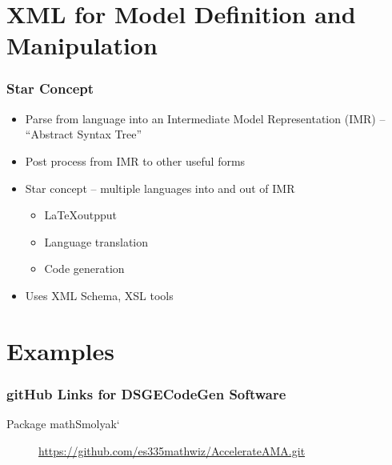 \documentclass[tikz]{beamer}
\begin{document}
\section{XML for  Model Definition and Manipulation}

\begin{frame}
  \frametitle{Star Concept}
  \begin{itemize}
 \item Parse from language into an Intermediate Model Representation (IMR)
 -- ``Abstract Syntax Tree'' 
  \item Post process from IMR to other useful forms
  \item Star concept --  multiple languages into and out of IMR
    \begin{itemize}
    \item \LaTeX outpput
    \item Language translation
    \item Code generation
    \end{itemize}

  \item Uses XML Schema, XSL tools
  \end{itemize}

\end{frame}
\section{Examples}


\begin{frame}
  \frametitle{gitHub Links for DSGECodeGen Software}
  

  \begin{description}
  \item[ \cite{Judd2013} Package mathSmolyak`] \href{https://github.com/es335mathwiz/AccelerateAMA.git}{https://github.com/es335mathwiz/AccelerateAMA.git}
\end{description}

\end{frame}
\end{document}
